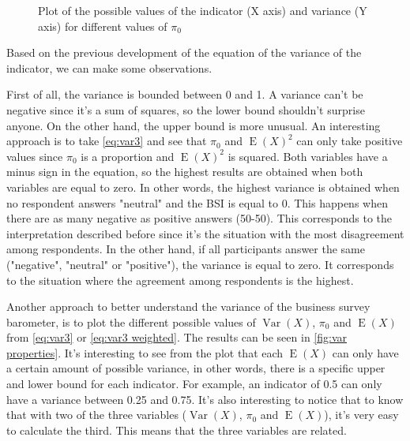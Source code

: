 \documentclass[12pt,a4paper,oneside]{book}
\DeclareMathOperator{\Var}{Var}
\DeclareMathOperator{\E}{E}
\begin{document}
\begin{figure}[hbt!]
    \caption{Plot of the possible values of the indicator (X axis) and variance (Y axis) for different values of $\pi_0$ }
    \label{fig:var properties}
\end{figure}


Based on the previous development of the equation of the variance of the indicator, we can make some observations.

First of all, the variance is bounded between 0 and 1. 
A variance can't be negative since it's a sum of squares, so the lower bound shouldn't surprise anyone. On the other hand, the upper bound is more unusual. 
An interesting approach is to take  \autoref{eq:var3} and see that $\pi_0$ and $\E(X)^2$ can only take positive values since $\pi_0$ is a proportion and $\E(X)^2$ is squared. 
Both variables have a minus sign in the equation, so the highest results are obtained when both variables are equal to zero.
In other words, the highest variance is obtained when no respondent answers "neutral" and the BSI is equal to 0. 
This happens when there are as many negative as positive answers (50-50).
This corresponds to the interpretation described before since it's the situation with the most disagreement among respondents.
In the other hand, if all participants answer the same ("negative", "neutral" or "positive"), the variance is equal to zero.
It corresponds to the situation where the agreement among respondents is the highest.

Another approach to better understand the variance of the business survey barometer, is to plot the different possible values of $\Var(X)$, $\pi_0$ and $\E(X)$ from \autoref{eq:var3} or \autoref{eq:var3 weighted}. The results can be seen in \autoref{fig:var properties}.
It's interesting to see from the plot that each $\E(X)$ can only have a certain amount of possible variance, in other words, there is a specific upper and lower bound for each indicator. For example, an indicator of 0.5 can only have a variance between 0.25 and 0.75.
It's also interesting to notice that to know that with two of the three variables ($\Var(X)$, $\pi_0$ and $\E(X)$), it's very easy to calculate the third. This means that the three variables are related.
\end{document}
